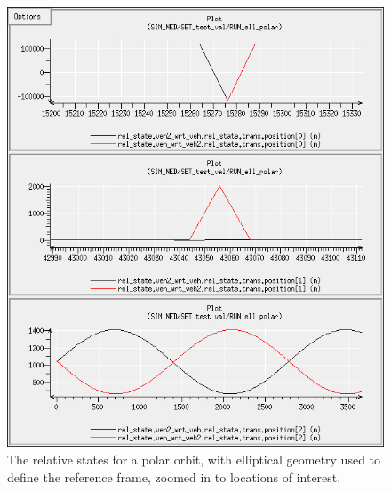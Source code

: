 \begin{description}
\begin{enumerate}
\begin{figure}[!ht]
\begin{center}
\includegraphics[width=5in]{figures/ned_polar_ell_zoom.jpg}
\caption{The relative states for a polar orbit, with elliptical geometry used to define the reference frame, zoomed in to locations of interest.}
\label{fig:nedpolarellzoom}
\end{center}
\end{figure}


\end{enumerate}
\end{description}
